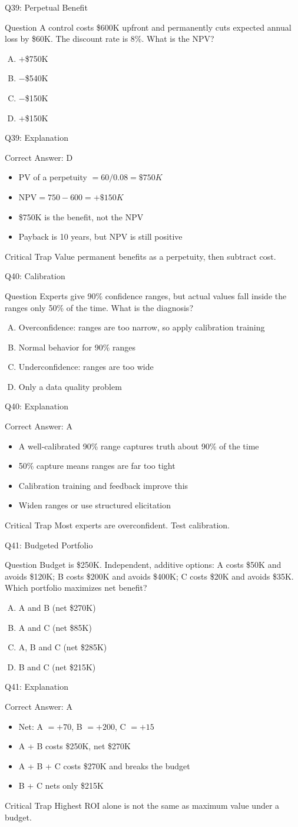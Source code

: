 \documentclass[aspectratio=169]{beamer}
\newcommand{\hq}[7]{%
  \begin{frame}{Q#1: #2}
    \begin{block}{Question}
      #3
    \end{block}
    \begin{enumerate}[(A)]
      #4
    \end{enumerate}
  \end{frame}
  \begin{frame}{Q#1: Explanation}
    \begin{block}{Correct Answer: #5}
      \begin{itemize}
        #6
      \end{itemize}
    \end{block}
    \begin{alertblock}{Critical Trap}
      #7
    \end{alertblock}
  \end{frame}
}
\begin{document}
\hq{39}{Perpetual Benefit}
{A control costs \$600K upfront and permanently cuts expected annual loss by \$60K. The discount rate is 8\%. What is the NPV?}
{\item $+$\$750K
 \item $-$\$540K
 \item $-$\$150K
 \item $+$\$150K}
{D}
{\item PV of a perpetuity $= 60 / 0.08 = \$750K$
 \item $\text{NPV} = 750 - 600 = +\$150K$
 \item \$750K is the benefit, not the NPV
 \item Payback is 10 years, but NPV is still positive}
{Value permanent benefits as a perpetuity, then subtract cost.}

\hq{40}{Calibration}
{Experts give 90\% confidence ranges, but actual values fall inside the ranges only 50\% of the time. What is the diagnosis?}
{\item Overconfidence: ranges are too narrow, so apply calibration training
 \item Normal behavior for 90\% ranges
 \item Underconfidence: ranges are too wide
 \item Only a data quality problem}
{A}
{\item A well-calibrated 90\% range captures truth about 90\% of the time
 \item 50\% capture means ranges are far too tight
 \item Calibration training and feedback improve this
 \item Widen ranges or use structured elicitation}
{Most experts are overconfident. Test calibration.}

\hq{41}{Budgeted Portfolio}
{Budget is \$250K. Independent, additive options: A costs \$50K and avoids \$120K; B costs \$200K and avoids \$400K; C costs \$20K and avoids \$35K. Which portfolio maximizes net benefit?}
{\item A and B (net \$270K)
 \item A and C (net \$85K)
 \item A, B and C (net \$285K)
 \item B and C (net \$215K)}
{A}
{\item Net: A $= +70$, B $= +200$, C $= +15$
 \item A + B costs \$250K, net \$270K
 \item A + B + C costs \$270K and breaks the budget
 \item B + C nets only \$215K}
{Highest ROI alone is not the same as maximum value under a budget.}
\end{document}
